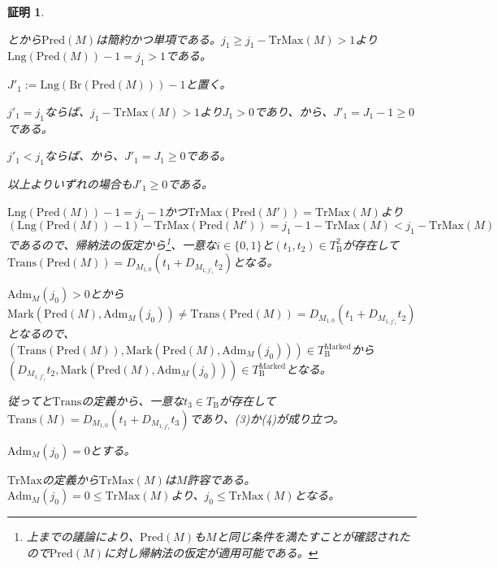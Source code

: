 \documentclass[dvipdfmx,uplatex]{jsarticle}
\theoremstyle{customnonumberbreakfortheorem}
\theoremstyle{customnonumberbreakforproof}
\newtheorem{hideableproof}{証明}
\begin{document}
\begin{hideableproof}
\begin{indented}
\begin{indented}
\begin{indented}
				\item {}とから\(\textrm{Pred}(M)\)は簡約かつ単項である。\(j_1 \geq j_1 - \textrm{TrMax}(M) > 1\)より\(\textrm{Lng}(\textrm{Pred}(M))-1 = j_1 > 1\)である。
				\item \(J'_1 := \textrm{Lng}(\textrm{Br}(\textrm{Pred}(M)))-1\)と置く。
				\item \(j'_1 = j_1\)ならば、\(j_1 - \textrm{TrMax}(M) > 1\)より\(J_1 > 0\)であり、から、\(J'_1 = J_1-1 \geq 0\)である。
				\item \(j'_1 < j_1\)ならば、から、\(J'_1 = J_1 \geq 0\)である。
				\item 以上よりいずれの場合も\(J'_1 \geq 0\)である。
				\item \(\textrm{Lng}(\textrm{Pred}(M))-1 = j_1-1\)かつ\(\textrm{TrMax}(\textrm{Pred}(M')) = \textrm{TrMax}(M)\)より\((\textrm{Lng}(\textrm{Pred}(M))-1) - \textrm{TrMax}(\textrm{Pred}(M')) = j_1-1 - \textrm{TrMax}(M) < j_1 - \textrm{TrMax}(M)\)であるので、帰納法の仮定から\footnote{上までの議論により、\(\textrm{Pred}(M)\)も\(M\)と同じ条件を満たすことが確認されたので\(\textrm{Pred}(M)\)に対し帰納法の仮定が適用可能である。}、一意な\(i \in \{0,1\}\)と\((t_1,t_2) \in T_{\textrm{B}}^2\)が存在して\(\textrm{Trans}(\textrm{Pred}(M)) = D_{M_{1,0}}(t_1 + D_{M_{1,j'_i}} t_2)\)となる。
				\item \(\textrm{Adm}_M(j_0) > 0\)とから\(\textrm{Mark}(\textrm{Pred}(M),\textrm{Adm}_M(j_0)) \neq \textrm{Trans}(\textrm{Pred}(M)) = D_{M_{1,0}}(t_1 + D_{M_{1,j'_i}} t_2)\)となるので、\((\textrm{Trans}(\textrm{Pred}(M)),\textrm{Mark}(\textrm{Pred}(M),\textrm{Adm}_M(j_0))) \in T_{\textrm{B}}^{\textrm{Marked}}\)から\((D_{M_{1,j'_i}} t_2,\textrm{Mark}(\textrm{Pred}(M),\textrm{Adm}_M(j_0))) \in T_{\textrm{B}}^{\textrm{Marked}}\)となる。
				\item 従ってと\(\textrm{Trans}\)の定義から、一意な\(t_3 \in T_{\textrm{B}}\)が存在して\(\textrm{Trans}(M) = D_{M_{1,0}}(t_1 + D_{M_{1,j'_i}} t_3)\)であり、(3)か(4)が成り立つ。
			\end{indented}
			\item \(\textrm{Adm}_M(j_0) = 0\)とする。
			\begin{indented}
				\item \(\textrm{TrMax}\)の定義から\(\textrm{TrMax}(M)\)は\(M\)許容である。\(\textrm{Adm}_M(j_0) = 0 \leq \textrm{TrMax}(M)\)より、\(j_0 \leq \textrm{TrMax}(M)\)となる。

\end{indented}
\end{indented}
\end{indented}
\end{hideableproof}
\end{document}
